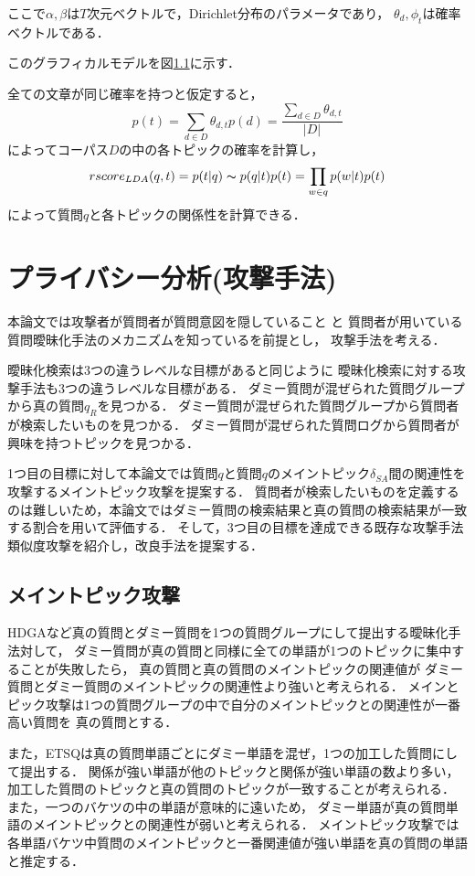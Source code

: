 \documentclass[master]{suribt}
\theoremstyle{definition}
\begin{document}
 ここで$\alpha,\beta$は$T$次元ベクトルで，Dirichlet分布のパラメータであり，
 $\theta_d,\phi_{t}$は確率ベクトルである．

 このグラフィカルモデルを図\ref{}に示す．

 全ての文章が同じ確率を持つと仮定すると，
 \begin{equation}
 p(t) = \sum_{d \in D}\theta_{d,t}p(d) = \frac{\sum_{d \in D} \theta_{d,t}}{|D|}
 \end{equation}
 によってコーパス$D$の中の各トピックの確率を計算し，
 \begin{equation}
 rscore_{LDA}(q,t) = p(t|q) \thicksim p(q|t)p(t) = \prod_{w \in q}p(w|t)p(t)
 \end{equation}
 によって質問$q$と各トピックの関係性を計算できる．


 \chapter{プライバシー分析(攻撃手法)}
 本論文では攻撃者が質問者が質問意図を隠していること
 と
 質問者が用いている質問曖昧化手法のメカニズムを知っているを前提とし，
 攻撃手法を考える．

 曖昧化検索は3つの違うレベルな目標があると同じように
 曖昧化検索に対する攻撃手法も3つの違うレベルな目標がある．
 ダミー質問が混ぜられた質問グループから真の質問$q_R$を見つかる．
 ダミー質問が混ぜられた質問グループから質問者が検索したいものを見つかる．
 ダミー質問が混ぜられた質問ログから質問者が興味を持つトピックを見つかる．

 1つ目の目標に対して本論文では質問$q$と質問$q$のメイントピック$\delta_{SA}$間の関連性を攻撃するメイントピック攻撃を提案する．
 質問者が検索したいものを定義するのは難しいため，本論文ではダミー質問の検索結果と真の質問の検索結果が一致する割合を用いて評価する．
 そして，3つ目の目標を達成できる既存な攻撃手法類似度攻撃\cite{simattack2016}を紹介し，改良手法を提案する．

 \section{メイントピック攻撃}
 HDGAなど真の質問とダミー質問を1つの質問グループにして提出する曖昧化手法対して，
 ダミー質問が真の質問と同様に全ての単語が1つのトピックに集中することが失敗したら，
 真の質問と真の質問のメイントピックの関連値が
 ダミー質問とダミー質問のメイントピックの関連性より強いと考えられる．
 メインとピック攻撃は1つの質問グループの中で自分のメイントピックとの関連性が一番高い質問を
 真の質問とする．

 また，ETSQは真の質問単語ごとにダミー単語を混ぜ，1つの加工した質問にして提出する．
 関係が強い単語が他のトピックと関係が強い単語の数より多い，
 加工した質問のトピックと真の質問のトピックが一致することが考えられる．
 また，一つのバケツの中の単語が意味的に遠いため，
 ダミー単語が真の質問単語のメイントピックとの関連性が弱いと考えられる．
 メイントピック攻撃では各単語バケツ中質問のメイントピックと一番関連値が強い単語を真の質問の単語と推定する．
\end{document}
